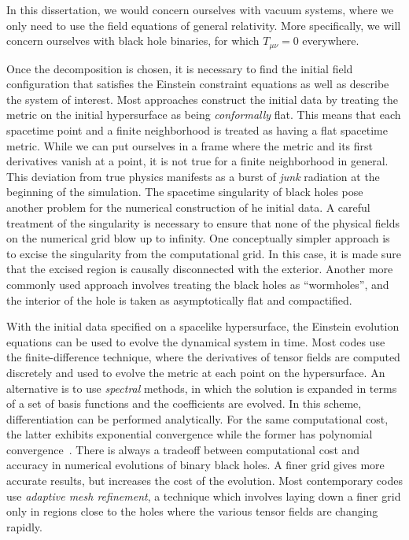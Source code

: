 In this dissertation, we would concern ourselves with vacuum systems, where 
we only need to use the field equations of general relativity. More 
specifically, we will concern ourselves with black hole binaries, for which 
$T_{\mu\nu}=0$ everywhere. 

% 
Once the decomposition is chosen, it is necessary to find the initial 
field configuration that satisfies the Einstein constraint equations as well as
describe the system of interest. Most approaches construct the initial 
data by treating the metric on the initial hypersurface as being 
{\it conformally} flat. This means that each spacetime point and a finite 
neighborhood is treated as having a flat spacetime metric.
While we can put ourselves in a frame where the metric and its first
derivatives vanish at a point, it is not true for a finite neighborhood in 
general.
This deviation from true physics manifests as a burst of {\it junk}
radiation at the beginning of the simulation. 
%
The spacetime singularity of black holes pose another problem for the 
numerical construction of he initial data. A careful treatment of the 
singularity is necessary to ensure that none of the physical fields on the
numerical grid blow up to infinity. One conceptually simpler approach is to 
excise the singularity from the computational grid. In this case, it is
made sure that the excised region is causally disconnected with the exterior. 
Another more commonly used approach involves treating the black holes as 
``wormholes'', and the interior of the hole is taken as asymptotically
flat and compactified. 

With the initial data specified on a spacelike hypersurface, the Einstein 
evolution equations can be used to evolve the dynamical system in time. 
Most codes use the finite-difference technique, where the derivatives of 
tensor fields are computed discretely and used to evolve the metric at
each point on the hypersurface. An alternative is to use {\it spectral}
methods, in which the solution is expanded in terms of a set of basis functions
and the coefficients are evolved. In this scheme, differentiation can be
performed analytically. For the same computational cost, the latter exhibits
exponential convergence while the former has polynomial
convergence~\cite{Hinder:2010vn}. There is always a tradeoff between 
computational cost and accuracy in numerical evolutions of binary black holes. 
A finer grid gives more accurate results, but increases the cost of the 
evolution. Most contemporary codes use {\it adaptive mesh refinement},
a technique which involves laying down a finer grid only in regions close to the
holes where the various tensor fields are changing rapidly.



